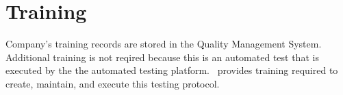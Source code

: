 \section{Training}
Company's training records are stored in the Quality Management System.
Additional training is not reqired because this is an automated test that is
executed by the the automated testing platform.  \sopSDLC\ provides training
required to create, maintain, and execute this testing protocol.
